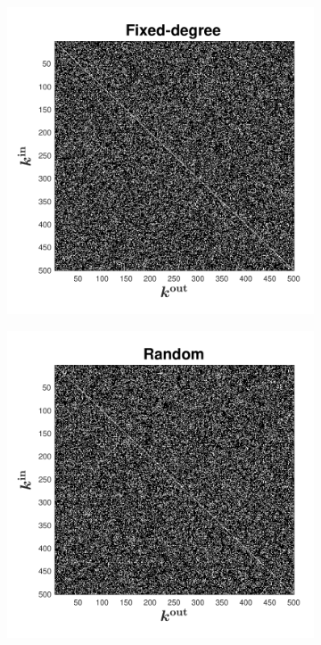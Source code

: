 \begin{figure}[ht]
\centering
\begin{subfigure}[b]{0.32\linewidth}
   \centering
  \includegraphics[width=\linewidth, trim={0.5cm 0.5cm 1cm 0.5cm },clip]{../Figures/Adjacency matrices/A_fixeddegree.pdf}
\end{subfigure} \hfill
\begin{subfigure}[b]{0.32\linewidth}
   \centering
  \includegraphics[width=\linewidth, trim={0.5cm 0.5cm 1cm 0.5cm },clip]{../Figures/Adjacency matrices/A_random.pdf}

\end{subfigure}
\end{figure}
